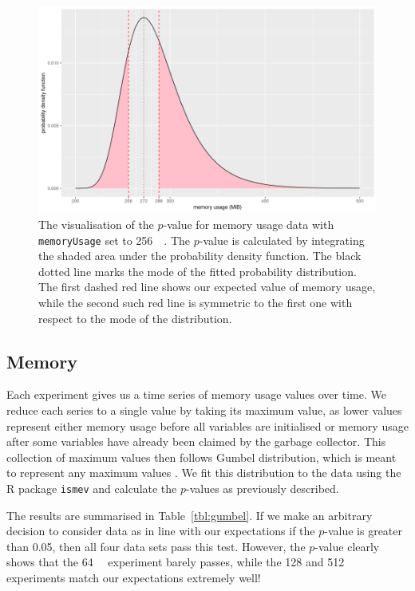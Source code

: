 \documentclass{article}
\begin{document}
\begin{figure}
  \centering
  \includegraphics[width=\textwidth]{../plots/p_value.png}
  \caption{The visualisation of the $p$-value for memory usage data with
    \texttt{memoryUsage} set to \SI{256}{\mebi\byte}. The $p$-value is
    calculated by integrating the shaded area under the probability density
    function. The black dotted line marks the mode of the fitted probability
    distribution. The first dashed red line shows our expected value of memory
    usage, while the second such red line is symmetric to the first one with
    respect to the mode of the distribution.}
  \label{fig:p_value}
\end{figure}

\subsection{Memory}

Each experiment gives us a time series of memory usage values over time. We
reduce each series to a single value by taking its maximum value, as lower
values represent either memory usage before all variables are initialised or
memory usage after some variables have already been claimed by the garbage
collector. This collection of maximum values then follows Gumbel distribution,
which is meant to represent any maximum values \cite{gumbel1935valeurs}. We fit
this distribution to the data using the R package \texttt{ismev}
\cite{heffernan2012ismev} and calculate the $p$-values as previously described.

The results are summarised in Table~\ref{tbl:gumbel}. If we make an arbitrary
decision to consider data as in line with our expectations if the $p$-value is
greater than 0.05, then all four data sets pass this test. However, the
$p$-value clearly shows that the \SI{64}{\mebi\byte} experiment barely passes,
while the 128 and \SI{512}{\mebi\byte} experiments match our expectations
extremely well!
\end{document}
